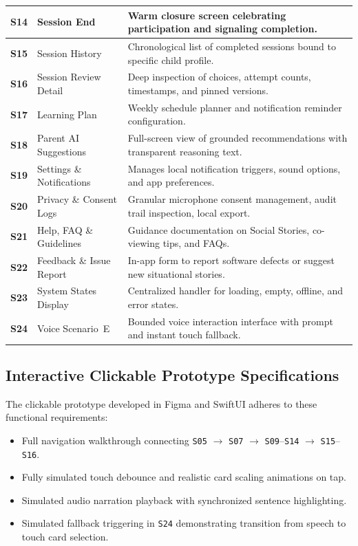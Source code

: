 \begin{xltabular}{\textwidth}{|p{1.2cm}|p{4.2cm}|X|}
\textbf{S14} & Session End & Warm closure screen celebrating participation and signaling completion. \\ \hline
\textbf{S15} & Session History & Chronological list of completed sessions bound to specific child profile. \\ \hline
\textbf{S16} & Session Review Detail & Deep inspection of choices, attempt counts, timestamps, and pinned versions. \\ \hline
\textbf{S17} & Learning Plan & Weekly schedule planner and notification reminder configuration. \\ \hline
\textbf{S18} & Parent AI Suggestions & Full-screen view of grounded recommendations with transparent reasoning text. \\ \hline
\textbf{S19} & Settings \& Notifications & Manages local notification triggers, sound options, and app preferences. \\ \hline
\textbf{S20} & Privacy \& Consent Logs & Granular microphone consent management, audit trail inspection, local export. \\ \hline
\textbf{S21} & Help, FAQ \& Guidelines & Guidance documentation on Social Stories, co-viewing tips, and FAQs. \\ \hline
\textbf{S22} & Feedback \& Issue Report & In-app form to report software defects or suggest new situational stories. \\ \hline
\textbf{S23} & System States Display & Centralized handler for loading, empty, offline, and error states. \\ \hline
\textbf{S24} & Voice Scenario~E & Bounded voice interaction interface with prompt and instant touch fallback. \\ \hline
\end{xltabular}
\label{tab:c5_screens}

\subsection{Interactive Clickable Prototype Specifications}

The clickable prototype developed in Figma and SwiftUI adheres to these functional requirements:
\begin{itemize}
    \item Full navigation walkthrough connecting \texttt{S05} $\rightarrow$ \texttt{S07} $\rightarrow$ \texttt{S09}--\texttt{S14} $\rightarrow$ \texttt{S15}--\texttt{S16}.
    \item Fully simulated touch debounce and realistic card scaling animations on tap.
    \item Simulated audio narration playback with synchronized sentence highlighting.
    \item Simulated fallback triggering in \texttt{S24} demonstrating transition from speech to touch card selection.
\end{itemize}

